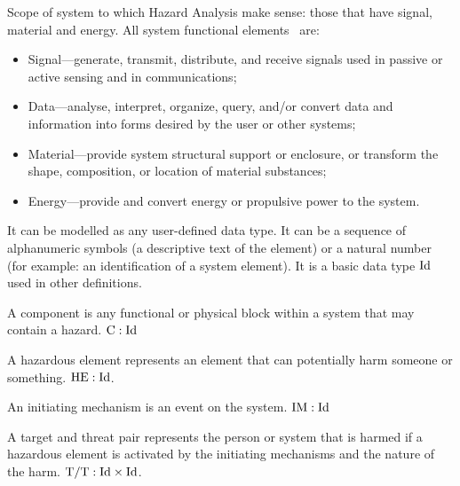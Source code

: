 Scope of system to which Hazard Analysis make sense: those that have signal, material and energy.
%
All system functional elements~\cite[p. 47]{KSS+2011} are:
\begin{itemize}
  \item Signal---generate, transmit, distribute, and receive signals used in passive or active sensing and in communications;
  \item Data---analyse, interpret, organize, query, and/or convert data and information into forms desired by the user or other systems;
  \item Material---provide system structural support or enclosure, or transform the shape, composition, or location of material substances;
  \item Energy---provide and convert energy or propulsive power to the system.
\end{itemize}

\begin{definition}[Identifier]
It can be modelled as any user-defined data type. It can be a sequence of alphanumeric symbols (a descriptive text of the element) or a natural number (for example: an identification of a system element). It is a basic data type $\mathrm{Id}$ used in other definitions.
\end{definition}

\begin{definition}[Component]
A component is any functional or physical block within a system that may contain a hazard. $\mathrm{C}: \mathrm{Id}$
\end{definition}

\begin{definition}
A hazardous element represents an element that can potentially harm someone or something.
$\mathrm{HE}: \mathrm{Id}$.
\end{definition}

\begin{definition}
An initiating mechanism is an event on the system.
%
$\mathrm{IM}: \mathrm{Id}$
\end{definition}

\begin{definition}
A target and threat pair represents the person or system that is harmed if a hazardous element is activated by the initiating mechanisms and the nature of the harm. 
%
$\mathrm{T/T}: \mathrm{Id}\times\mathrm{Id}$.
\end{definition}

